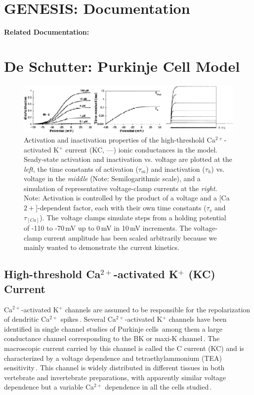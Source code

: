 \documentclass[12pt]{article}
\begin{document}
\section*{GENESIS: Documentation}

{\bf Related Documentation:}

\section*{De Schutter: Purkinje Cell Model}

\begin{figure}[h]
\centering
   \includegraphics[scale=0.75]{figures/DS1.2G.eps}
   \caption{Activation and inactivation properties of the high-threshold Ca$^{2+}$-activated K$^+$ current (KC, ---) ionic conductances in the model. Seady-state activation and inactivation vs. voltage are plotted at the {\em left}, the time constants of activation ($\tau_m$) and inactivation ($\tau_h$) vs. voltage in the {\em middle} (Note: Semilogarithmic scale), and a simulation of representative voltage-clamp currents at the {\em right}. Note: Activation is controlled by the product of a voltage and a [Ca${2+}$]-dependent factor, each with their own time constants ($\tau_v$ and $\tau_{[Ca]}$). The voltage clamps simulate steps from a holding potential of -110 to -70\,mV up to 0\,mV in 10\,mV increments. The voltage-clamp current amplitude has been scaled arbitrarily because we mainly wanted to demonstrate the current kinetics.}
   \label{fig:DS1.2G}
\end{figure}

\subsection*{High-threshold Ca$^{2+}$-activated K$^+$ (KC) Current}

Ca$^{2+}$-activated K$^+$ channels are assumed to be responsible for the repolarization of dendritic Ca$^{2+}$ spikes\,\cite{R:1980pi}. Several Ca$^{2+}$-activated K$^+$ channels have been identified in single channel studies of Purkinje cells\,\cite{Gahwiler:1989fk, Gruol:1989oq, Gruol:1991dz} among them a large conductance channel corresponding to the BK or maxi-K channel\,\cite{Latorre:1989fu}. The macroscopic current carried by this channel is called the C current (KC) and is characterized by a voltage dependence and tetraethylammonium (TEA) sensitivity\,\cite{Adams:1982uq}. This channel is widely distributed in different tissues in both vertebrate and invertebrate preparations, with apparently similar voltage dependence but a variable Ca$^{2+}$ dependence in all the cells studied\,\cite{Latorre:1989fu}.
\end{document}
